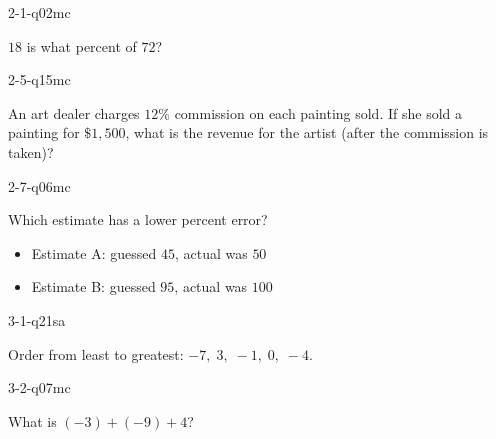 \documentclass[12pt, fleqn, openany]{studyGuide}
\begin{document}
\begin{practiceQuestion}{2-1-q02}{mc}
\begin{questionText}
$18$ is what percent of $72$?
\end{questionText}
\end{practiceQuestion}

\begin{practiceQuestion}{2-5-q15}{mc}
\begin{questionText}
An art dealer charges $12\%$ commission on each painting sold. If she sold a painting for $\$1{,}500$, what is the revenue for the artist (after the commission is taken)?
\end{questionText}
\end{practiceQuestion}

\begin{practiceQuestion}{2-7-q06}{mc}
\begin{questionText}
Which estimate has a lower percent error?
\begin{itemize}
    \item Estimate A: guessed $45$, actual was $50$
    \item Estimate B: guessed $95$, actual was $100$
\end{itemize}
\end{questionText}
\end{practiceQuestion}

\begin{practiceQuestion}{3-1-q21}{sa}
\begin{questionText}
Order from least to greatest: $-7, \; 3, \; -1, \; 0, \; -4$.
\end{questionText}
\end{practiceQuestion}

\begin{practiceQuestion}{3-2-q07}{mc}
\begin{questionText}
What is $(-3) + (-9) + 4$?
\end{questionText}
\end{practiceQuestion}
\end{document}
